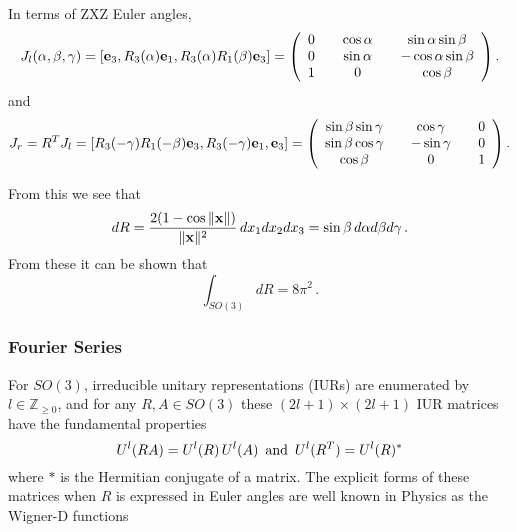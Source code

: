 \documentclass{svmult}
\newcommand{\beq}{ \begin{equation}}
\newcommand{\eeq}{ \end{equation} }
\newcommand{\IZ}{\mathbb{Z}}
\begin{document}
In terms of ZXZ Euler angles,
\beq
{J}_l(\alpha,\beta,\gamma) =
\left[{\bf e}_3, {R_3}(\alpha) {\bf e}_1, {R_3}(\alpha){R_1}(\beta) {\bf e}_3 \right]
=
\left(\begin{array}{ccccc}
0 & &   \cos \alpha & &   \sin \alpha \sin \beta \\
0 & &   \sin \alpha & &   -\cos \alpha \sin \beta \\
1 & &   0 & &   \cos \beta
\end{array}\right).
\label{jleul}
\eeq
and
\beq
{J}_r = {R^T} J_{l} =
\left[{R_3}(-\gamma) {R_1}(-\beta)
{\bf e}_3, {R_3}(-\gamma) {\bf e}_1, {\bf e}_3 \right]
=  \left(\begin{array}{ccccc}
\sin \beta \sin \gamma & &   \cos \gamma & &   0 \\
\sin \beta \cos \gamma & &   -\sin \gamma & &   0 \\
\cos \beta & &   0 & &   1 \end{array}\right).
\label{jreul}
\eeq

From this we see that
$$ dR = \frac{2(1-\cos\|{\bf x}\|)}{\|{\bf x}\|^2}\, dx_1 dx_2 dx_3 = \sin\beta\, d\alpha d\beta d\gamma\,. $$
From these it can be shown that
$$ \int_{SO(3)} dR = 8\pi^2\,. $$

\subsubsection{Fourier Series}

For $SO(3)$, irreducible unitary representations (IURs) \cite{dover}
are enumerated by $l \in \IZ_{\geq 0}$, and for any $R,A \in SO(3)$ these $(2l+1)\times(2l+1)$ IUR matrices have the fundamental properties
$$ U^l(R A) = U^l(R)\, U^l(A) \,\,\, {\rm and} \,\,\, U^l(R^T) = U^l(R)^* $$
where $*$ is the Hermitian conjugate of a matrix. The explicit forms of these matrices when $R$ is expressed
in Euler angles are well known in
Physics as the Wigner-D functions \cite{9biedenharn1,9gelfand,9talman,9varshalovich,9Wigner1959}
\end{document}
